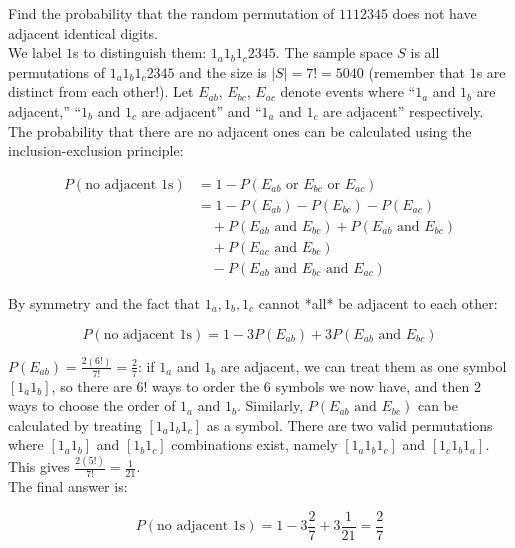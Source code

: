 \documentclass[12pt, a4paper]{article}
\newcounter{exa}
\begin{document}
\begin{texample}
Find the probability that the random permutation of $1112345$ does not have adjacent identical digits. \\

We label $1$s to distinguish them: $1_a 1_b 1_c 2345$. The sample space $S$ is all permutations of $1_a 1_b 1_c 2345$ and the size is $|S|=7!=5040$ (remember that $1$s are distinct from each other!). Let $E_{ab}$, $E_{bc}$, $E_{ac}$ denote events where ``$1_a$ and $1_b$ are adjacent,'' ``$1_b$ and $1_c$ are adjacent'' and ``$1_a$ and $1_c$ are adjacent'' respectively. The probability that there are no adjacent ones can be calculated using the inclusion-exclusion principle:

\begin{align*}
P(\text{no adjacent 1s}) &= 1 - P(E_{ab} \text{ or } E_{bc} \text{ or } E_{ac}) \\
&= 1 - P(E_{ab}) - P(E_{bc}) - P(E_{ac}) \\
& \quad + P(E_{ab} \text{ and } E_{bc}) + P(E_{ab} \text{ and } E_{bc})  \\
& \quad + P(E_{ac} \text{ and } E_{bc}) \\
& \quad - P(E_{ab} \text{ and } E_{bc} \text{ and } E_{ac})
\end{align*}

By symmetry and the fact that $1_a, 1_b, 1_c$ cannot *all* be adjacent to each other:

$$P(\text{no adjacent 1s}) = 1 - 3 P(E_{ab}) + 3 P(E_{ab} \text{ and } E_{bc})$$

$P(E_{ab}) = \frac{2 (6!)}{7!} = \frac27$: if $1_a$ and $1_b$ are adjacent, we can treat them as one symbol $[1_a 1_b]$, so there are $6!$ ways to order the $6$ symbols we now have, and then $2$ ways to choose the order of $1_a$ and $1_b$. Similarly, $P(E_{ab} \text{ and } E_{bc})$ can be calculated by treating $[1_a 1_b 1_c]$ as a symbol. There are two valid permutations where $[1_a 1_b]$ and $[1_b 1_c]$ combinations exist, namely $[1_a 1_b 1_c]$ and $[1_c 1_b 1_a]$. This gives $\frac{2 (5!)}{7!}=\frac{1}{21}$. \\

The final answer is:

$$P(\text{no adjacent 1s}) = 1 - 3 \frac27 + 3 \frac{1}{21} = \frac27$$
\end{texample}
\end{document}
